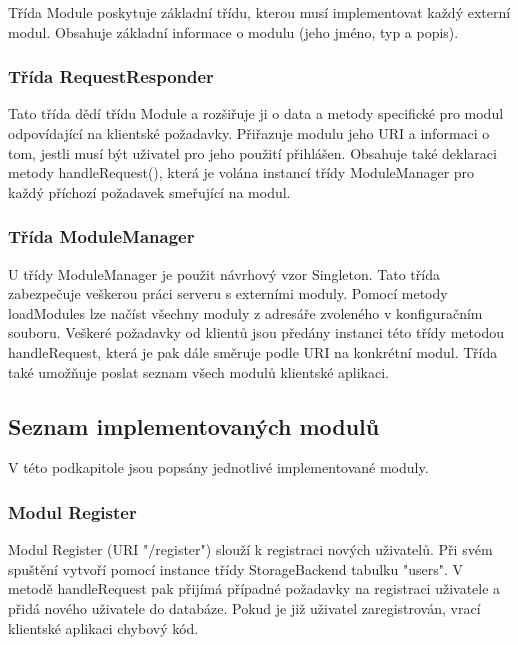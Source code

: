 Třída Module poskytuje základní třídu, kterou musí implementovat každý externí modul. Obsahuje základní informace o modulu 
(jeho jméno, typ a popis).

\subsubsection{Třída RequestResponder}

Tato třída dědí třídu Module a rozšiřuje ji o data a metody specifické pro modul odpovídající na klientské požadavky.
Přiřazuje modulu jeho URI a informaci o tom, jestli musí být uživatel pro jeho použití přihlášen.
Obsahuje také deklaraci metody handleRequest(), která je volána instancí třídy ModuleManager pro každý příchozí požadavek
smeřující na modul.

\subsubsection{Třída ModuleManager}

U třídy ModuleManager je použit návrhový vzor Singleton.
Tato třída zabezpečuje veškerou práci serveru s externími moduly. Pomocí 
metody loadModules lze načíst všechny moduly z adresáře zvoleného v konfiguračním souboru. Veškeré požadavky od klientů
jsou předány instanci této třídy metodou handleRequest, která je pak dále směruje podle URI na konkrétní modul. Třída také
umožňuje poslat seznam všech modulů klientské aplikaci.

\subsection{Seznam implementovaných modulů} %
\label{implementace_moduly_list}

V této podkapitole jsou popsány jednotlivé implementované moduly.

\subsubsection{Modul Register}

Modul Register (URI "/register") %
slouží k registraci nových uživatelů. Při svém spuštění vytvoří pomocí
instance třídy StorageBackend tabulku "users". V metodě handleRequest pak přijímá případné požadavky na registraci
uživatele a přidá nového uživatele do databáze. Pokud je již uživatel zaregistrován, vrací klientské aplikaci chybový kód.

